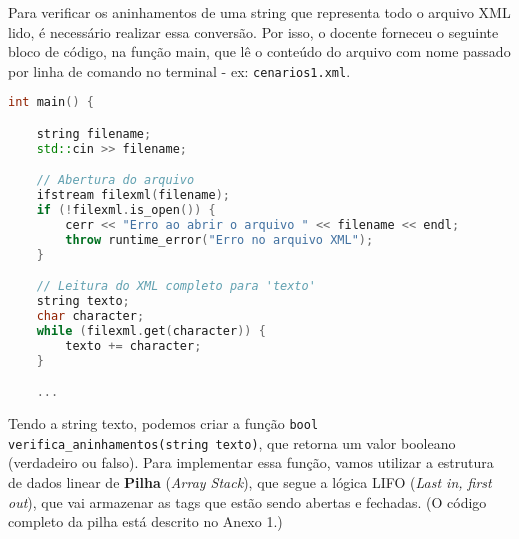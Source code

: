 Para verificar os aninhamentos de uma string que representa todo o arquivo XML lido, é necessário realizar essa conversão. Por isso, o docente forneceu o seguinte bloco de código, na função main, que lê o conteúdo do arquivo com nome passado por linha de comando no terminal - ex: \texttt{cenarios1.xml}.


\begin{lstlisting}[language=c++]
int main() {

    string filename;
    std::cin >> filename;

    // Abertura do arquivo
    ifstream filexml(filename);
    if (!filexml.is_open()) {
        cerr << "Erro ao abrir o arquivo " << filename << endl;
        throw runtime_error("Erro no arquivo XML");
    }

    // Leitura do XML completo para 'texto'
    string texto;
    char character;
    while (filexml.get(character)) {
        texto += character;
    }

    ...
\end{lstlisting}

Tendo a string texto, podemos criar a função \texttt{bool verifica\_aninhamentos(string texto)}, que retorna um valor booleano (verdadeiro ou falso). Para implementar essa função, vamos utilizar a estrutura de dados linear de \textbf{Pilha} (\textit{Array Stack}), que segue a lógica LIFO (\textit{Last in, first out}), que vai armazenar as tags que estão sendo abertas e fechadas. (O código completo da pilha está descrito no Anexo 1.)

